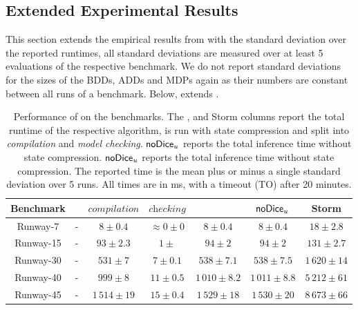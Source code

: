\subsection{Extended Experimental Results}\label{app:extended_results}


This section extends the empirical results from  with the standard deviation over the reported runtimes, all standard deviations are measured over at least 5 evaluations of the respective benchmark.
We do not report standard deviations for the sizes of the BDDs, ADDs and MDPs again as their numbers are constant between all runs of a benchmark.
Below,  extends .

\begin{table}[H]
	\caption{Performance of \NDICE on the benchmarks. 
		The \DICE, \NDICE and Storm columns report the total runtime of the respective algorithm, \NDICE is run with state compression and split into \textit{compilation} and \textit{model checking}.
		$\NDICE_u$ reports the total inference time without state compression.
		$\NDICE_u$ reports the total inference time without state compression.
		The reported time is the mean plus or minus a single standard deviation over 5 runs.
		All times are in ms, with a timeout (TO) after 20 minutes.
		}
	\label{tab:Ndet_extended}
	\begin{adjustbox}{max width=\textwidth}
	\begin{tabu}{c | c | ccc | c | c}
		\toprule
		Benchmark & \DICE &  $\mathit{compilation}$ & $\textit{checking}$ & \NDICE & $\NDICE_u$ & Storm \\
		\midrule
		Runway-7 & - & $8\pm 0.4$ & {$\approx 0 \pm 0$} & {$8 \pm 0.4$} & {$8 \pm 0.4$} & {$18 \pm 2.8$} \\
		Runway-15 & - & $93 \pm 2.3$ & {$1 \pm $} & {$94 \pm 2$} & {$94 \pm 2 $} & {$131 \pm 2.7$} \\
		Runway-30 & - & $531 \pm 7$ & {$7 \pm 0.1 $} & {$538 \pm 7.1 $} & {$538 \pm 7.5$ } & {$1\, 620 \pm 14$} \\
		Runway-40 & - & $999 \pm 8$ & {$11 \pm 0.5 $} & {$1\,010 \pm 8.2$} & {$1\,011 \pm  8.8$} & {$5\,212 \pm 61$} \\
		Runway-45 & - & $1\,514 \pm 19$ & {$15 \pm 0.4$} & {$1\,529 \pm 18$} & {$1\,530 \pm 20 $} & {$8\,673 \pm 66$} \\
		

\end{tabu}
\end{adjustbox}
\end{table}
